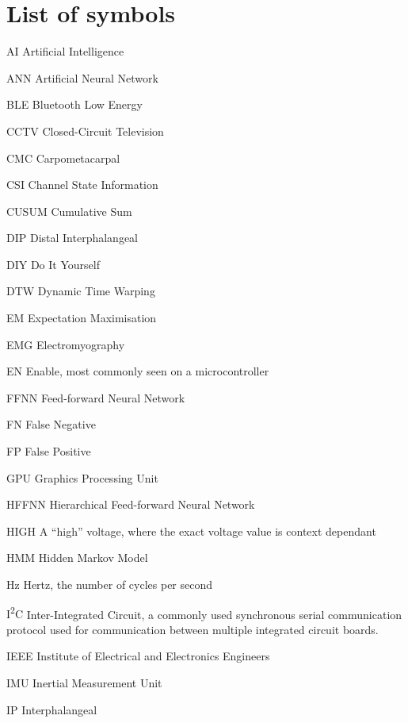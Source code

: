 \chapter{List of symbols}\label{chap:symbols}

\begin{Nomencl}[1cm]
    \item[AI] Artificial Intelligence
    \item[ANN] Artificial Neural Network
    \item[BLE] Bluetooth Low Energy
    \item[CCTV] Closed-Circuit Television
    \item[CMC] Carpometacarpal
    \item[CSI] Channel State Information
    \item[CUSUM] Cumulative Sum
    \item[DIP] Distal Interphalangeal
    \item[DIY] Do It Yourself
    \item[DTW] Dynamic Time Warping
    \item[EM] Expectation Maximisation
    \item[EMG] Electromyography
    \item[EN] Enable, most commonly seen on a microcontroller
    \item[FFNN] Feed-forward Neural Network
    \item[FN] False Negative
    \item[FP] False Positive
    \item[GPU] Graphics Processing Unit
    \item[HFFNN] Hierarchical Feed-forward Neural Network
    \item[HIGH] A ``high'' voltage, where the exact voltage value is context dependant
    \item[HMM] Hidden Markov Model
    \item[Hz] \label{nom:hz} Hertz, the number of cycles per second
    \item[I\textsuperscript{2}C] \label{nom:i2c} Inter-Integrated Circuit, a commonly used
        synchronous serial communication protocol used for communication
        between multiple integrated circuit boards.
    \item[IEEE] Institute of Electrical and Electronics Engineers
    \item[IMU] Inertial Measurement Unit
    \item[IP] Interphalangeal

\end{Nomencl}
